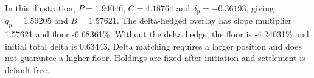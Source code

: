 \documentclass[11pt,letterpaper]{article}
\newcommand{\rQ}{1.59205}
\newcommand{\rDelta}{-0.36193}
\newcommand{\rForeign}{1.57621}
\newcommand{\rFloor}{-6.68361}
\newcommand{\rSlope}{1.57621}
\newcommand{\rPut}{1.94046}
\newcommand{\rCall}{4.18764}
\newcommand{\rUnhedgedDelta}{0.63443}
\newcommand{\rNoHedgeFloor}{-4.24031}
\begin{document}
In this illustration, $P=\rPut{}$, $C=\rCall{}$ and $\delta_p=\rDelta{}$, giving $q_p=\rQ{}$ and $B=\rForeign{}$.
The delta-hedged overlay has slope multiplier \rSlope{} and floor \rFloor{}\%.
Without the delta hedge, the floor is \rNoHedgeFloor{}\% and initial total delta
is \rUnhedgedDelta{}. Delta matching requires a larger position and does not guarantee a higher floor.
Holdings are fixed after initiation and settlement is default-free.
\end{document}
